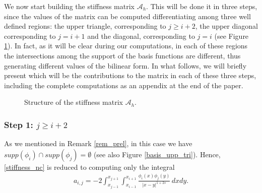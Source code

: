 We now start building the stiffness matrix $\mathcal A_h$. This will be done it in three steps, since the values of the matrix can be computed differentiating among three well defined regions: the upper triangle, corresponding to $j\geq i+2$, the upper diagonal corresponding to $j=i+1$ and the diagonal, corresponding to $j=i$ (see Figure \ref{matrix_fig}). In fact, as it will be clear during our computations, in each of these regions the intersections among the support of the basis functions are different, thus generating different values of the bilinear form. In what follows, we will briefly present which will be the contributions to the matrix in each of these three steps, including the complete computations as an appendix at the end of the paper. 

\begin{figure}[!h]
\centering
{}
\caption{Structure of the stiffness matrix $\mathcal{A}_h$.}\label{matrix_fig}
\end{figure}

\subsubsection*{Step 1: $j\geq i+2$}
As we mentioned in Remark \ref{rem_prel}, in this case we have $supp(\phi_i)\cap supp(\phi_j) =\emptyset$ (see also Figure \ref{basis_upp_tri}). Hence, \eqref{stiffness_nc} is reduced to computing only the integral
\begin{align}\label{elem_noint}
	a_{i,j}=-2 \int_{x_{j-1}}^{x_{j+1}}\int_{x_{i-1}}^{x_{i+1}}\frac{\phi_i(x)\phi_j(y)}{|x-y|^{1+2s}}\,dxdy.
\end{align}

